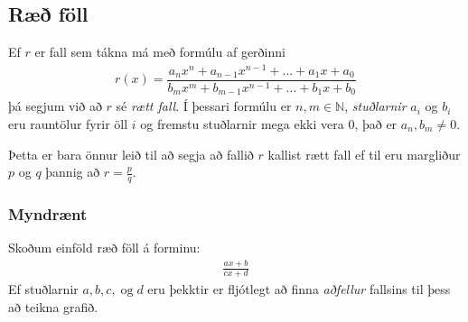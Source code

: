 \documentclass[a4paper,10pt,icelandic]{sphinxmanual}
\begin{document}
\subsection{Ræð föll}
\label{\detokenize{Kafli09:rae-foll}}
Ef \(r\) er fall sem tákna má með formúlu af gerðinni
\begin{equation*}
\begin{split}r(x)=\dfrac{a_nx^n+a_{n-1}x^{n-1}+...+a_1x+a_0}{b_mx^m+b_{m-1}x^{n-1}+...+b_1x+b_0}\end{split}
\end{equation*}
þá segjum við að \(r\) sé \textit{rætt fall}.
Í þessari formúlu er \(n,m\in\mathbb{N}\), \textit{stuðlarnir} \(a_i\) og \(b_i\) eru rauntölur fyrir öll \(i\) og fremstu stuðlarnir mega ekki vera \(0\), það er \(a_n,b_m\not=0\).

Þetta er bara önnur leið til að segja að fallið \(r\) kallist rætt fall ef til eru margliður \(p\) og \(q\) þannig að \(r=\frac{p}{q}\).


\subsubsection{Myndrænt}
\label{\detokenize{Kafli09:myndraent}}
Skoðum einföld ræð föll á forminu:
\begin{equation*}
\begin{split}\frac{ax+b}{cx+d}\end{split}
\end{equation*}
Ef stuðlarnir \(a,b,c, \; \text{og} \; d\) eru þekktir er fljótlegt að finna \textit{aðfellur} fallsins til þess að teikna grafið.
\end{document}
